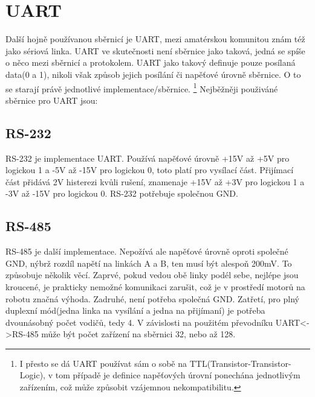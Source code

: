 \section{UART}
Další hojně používanou sběrnicí je UART, mezi amatérskou komunitou znám též jako sériová linka.
UART ve skutečnosti není sběrnice jako taková, jedná se spíše o něco mezi sběrnicí a protokolem.
UART jako takový definuje pouze posílaná data(0 a 1), nikoli však způsob jejich posílání či napěťové úrovně sběrnice.
O to se starají právě jednotlivé implementace/sběrnice.
\footnote{I přesto se dá UART používat sám o sobě na TTL(Transistor-Transistor-Logic), v tom případě je definice napěťových úrovní ponechána jednotlivým zařízením, což může způsobit vzájemnou nekompatibilitu.}
Nejběžněji použiváné sběrnice pro UART jsou:
\subsection{RS-232} %
RS-232 je implementace UART.
Používá napěťové úrovně +15V až +5V pro logickou 1 a -5V až -15V pro logickou 0, toto platí pro vysílací část.
Přijímací část přidává 2V histerezi kvůli rušení, znamenaje +15V až +3V pro logickou 1 a -3V až -15V pro logickou 0.
RS-232 potřebuje společnou GND.
\cite{RS-232} 
\subsection{RS-485} %
RS-485 je další implementace.
Nepožívá ale napěťové úrovně oproti společné GND, nýbrž rozdíl napětí na linkách A a B, ten musí být alespoň 200mV.
To způsobuje několik věcí.
Zaprvé, pokud vedou obě linky podél sebe, nejlépe jsou kroucené, je prakticky nemožné komunikaci zarušit, což je v prostředí motorů na robotu značná výhoda.
Zadruhé, není potřeba společná GND.
Zatřetí, pro plný duplexní mód(jedna linka na vysílání a jedna na přijímaní) je potřeba dvounásobný počet vodičů, tedy 4.
V závislosti na použitém převodníku UART<->RS-485 může být počet zařízení na sběrnici 32, nebo až 128.
\cite{RS-485}

